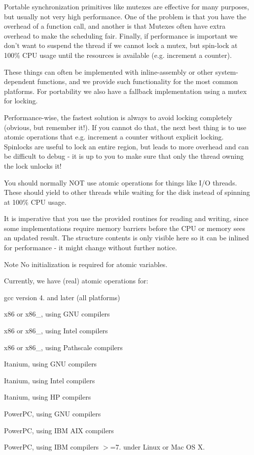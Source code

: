 \-Portable synchronization primitives like mutexes are effective for many purposes, but usually not very high performance. \-One of the problem is that you have the overhead of a function call, and another is that \-Mutexes often have extra overhead to make the scheduling fair. \-Finally, if performance is important we don't want to suspend the thread if we cannot lock a mutex, but spin-\/lock at 100\% \-C\-P\-U usage until the resources is available (e.\-g. increment a counter).

\-These things can often be implemented with inline-\/assembly or other system-\/dependent functions, and we provide such functionality for the most common platforms. \-For portability we also have a fallback implementation using a mutex for locking.

\-Performance-\/wise, the fastest solution is always to avoid locking completely (obvious, but remember it!). \-If you cannot do that, the next best thing is to use atomic operations that e.\-g. increment a counter without explicit locking. \-Spinlocks are useful to lock an entire region, but leads to more overhead and can be difficult to debug -\/ it is up to you to make sure that only the thread owning the lock unlocks it!

\-You should normally \-N\-O\-T use atomic operations for things like \-I/\-O threads. \-These should yield to other threads while waiting for the disk instead of spinning at 100\% \-C\-P\-U usage.

\-It is imperative that you use the provided routines for reading and writing, since some implementations require memory barriers before the \-C\-P\-U or memory sees an updated result. \-The structure contents is only visible here so it can be inlined for performance -\/ it might change without further notice.

\begin{DoxyNote}{\-Note}
\-No initialization is required for atomic variables.
\end{DoxyNote}
\-Currently, we have (real) atomic operations for\-:


\begin{DoxyItemize}
\item gcc version 4. and later (all platforms)
\item x86 or x86\-\_, using \-G\-N\-U compilers
\item x86 or x86\-\_, using \-Intel compilers
\item x86 or x86\-\_, using \-Pathscale compilers
\item \-Itanium, using \-G\-N\-U compilers
\item \-Itanium, using \-Intel compilers
\item \-Itanium, using \-H\-P compilers
\item \-Power\-P\-C, using \-G\-N\-U compilers
\item \-Power\-P\-C, using \-I\-B\-M \-A\-I\-X compilers
\item \-Power\-P\-C, using \-I\-B\-M compilers $>$=7. under \-Linux or \-Mac \-O\-S \-X.
\end{DoxyItemize}

